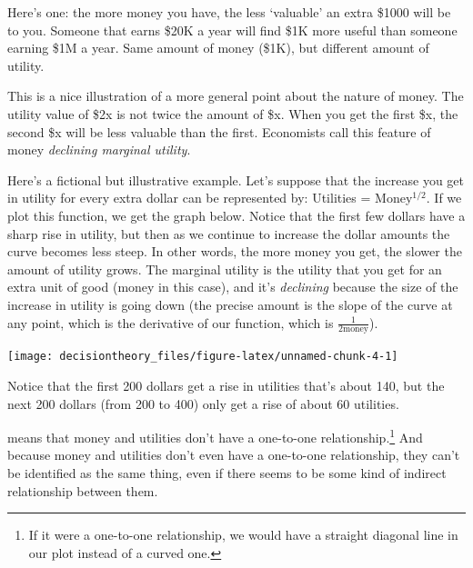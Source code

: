 \documentclass[]{tufte-book}
\begin{document}
Here's one: the more money you have, the less `valuable' an extra \$1000 will be to you. Someone that earns \$20K a year will find \$1K more useful than someone earning \$1M a year. Same amount of money (\$1K), but different amount of utility.

This is a nice illustration of a more general point about the nature of money. The utility value of \$2x is not twice the amount of \$x. When you get the first \$x, the second \$x will be less valuable than the first. Economists call this feature of money \emph{declining marginal utility}.

Here's a fictional but illustrative example. Let's suppose that the increase you get in utility for every extra dollar can be represented by: Utilities = Money\(^{1/2}\). If we plot this function, we get the graph below. Notice that the first few dollars have a sharp rise in utility, but then as we continue to increase the dollar amounts the curve becomes less steep. In other words, the more money you get, the slower the amount of utility grows. The marginal utility is the utility that you get for an extra unit of good (money in this case), and it's \emph{declining} because the size of the increase in utility is going down (the precise amount is the slope of the curve at any point, which is the derivative of our function, which is \(\frac{1}{2\text{money}}\)).

\begin{marginfigure}
\texttt{[image: decisiontheory\_files/figure-latex/unnamed-chunk-4-1]} \caption[Notice that the first 200 dollars get a rise in utilities that's about 140, but the next 200 dollars (from 200 to 400) only get a rise of about 60 utilities]{Notice that the first 200 dollars get a rise in utilities that's about 140, but the next 200 dollars (from 200 to 400) only get a rise of about 60 utilities.}\label{fig:unnamed-chunk-4}
\end{marginfigure}

 means that money and utilities don't have a one-to-one relationship.\footnote{If it were a one-to-one relationship, we would have a straight diagonal line in our plot instead of a curved one.} And because money and utilities don't even have a one-to-one relationship, they can't be identified as the same thing, even if there seems to be some kind of indirect relationship between them.
\end{document}
